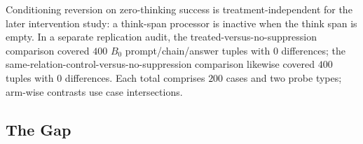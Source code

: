 \documentclass[letterpaper]{article} %
\begin{document}
Conditioning reversion on zero-thinking success is treatment-independent for the later intervention study: a think-span processor is inactive when the think span is empty.  In a separate replication audit, the treated-versus-no-suppression comparison covered \(400\) \(B_0\) prompt/chain/answer tuples with \(0\) differences; the same-relation-control-versus-no-suppression comparison likewise covered \(400\) tuples with \(0\) differences. Each total comprises \(200\) cases and two probe types; arm-wise contrasts use case intersections. %

\subsection{The Gap}
\label{sec:gap-results}
\end{document}
